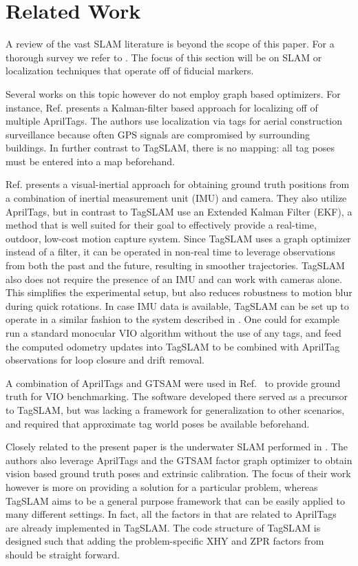 \section{Related Work}
A review of the vast SLAM literature is beyond the scope of this
paper. For a thorough survey we refer to \cite{cadena2016}. The focus
of this section will be on SLAM or localization techniques that
operate off of fiducial markers.

Several works on this topic however do not employ graph based
optimizers. For instance, Ref. \cite{kayhani2019} presents a
Kalman-filter based approach for localizing off of multiple
AprilTags. The authors
use localization via tags for aerial construction surveillance because
often GPS signals are compromised by surrounding buildings. In further
contrast to TagSLAM, there is no mapping: all tag poses must be
entered into a map beforehand.

Ref. \cite{neunert2016} presents a visual-inertial approach for
obtaining ground truth positions from a combination of inertial
measurement unit (IMU) and camera. They also utilize AprilTags, but in
contrast to TagSLAM use an Extended Kalman Filter (EKF), a method that
is well suited for their goal to effectively provide a real-time,
outdoor, low-cost motion capture system. Since TagSLAM uses a graph
optimizer instead of a filter, it can be operated in non-real time to
leverage observations from both the past and the future, resulting in
smoother trajectories. TagSLAM also does not require the presence of
an IMU and can work with cameras alone. This simplifies the
experimental setup, but also reduces robustness to motion blur during
quick rotations. In case IMU data is available, TagSLAM can be set up
to operate in a similar fashion to the system described in
\cite{neunert2016}. One could for example run a standard monocular VIO
algorithm without the use of any tags, and feed the computed odometry
updates into TagSLAM to be combined with AprilTag observations for
loop closure and drift removal.

A combination of AprilTags and GTSAM were used in
Ref.\ \cite{pfrommer2017} to provide ground truth for VIO
benchmarking. The software developed there served as a precursor to
TagSLAM, but was lacking a framework for generalization to other
scenarios, and required that approximate tag world poses be available
beforehand.

Closely related to the present paper is the underwater SLAM performed
in \cite{westman2018}. The authors also leverage AprilTags and the
GTSAM factor graph optimizer to obtain vision based ground truth poses
and extrinsic calibration. The focus of their work however is more on
providing a solution for a particular problem, whereas TagSLAM aims to
be a general purpose framework that can be easily applied to many
different settings. In fact, all the factors in \cite{westman2018}
that are related to AprilTags are already implemented in TagSLAM. The
code structure of TagSLAM is designed such that adding the
problem-specific XHY and ZPR factors from \cite{westman2018} should be
straight forward.

